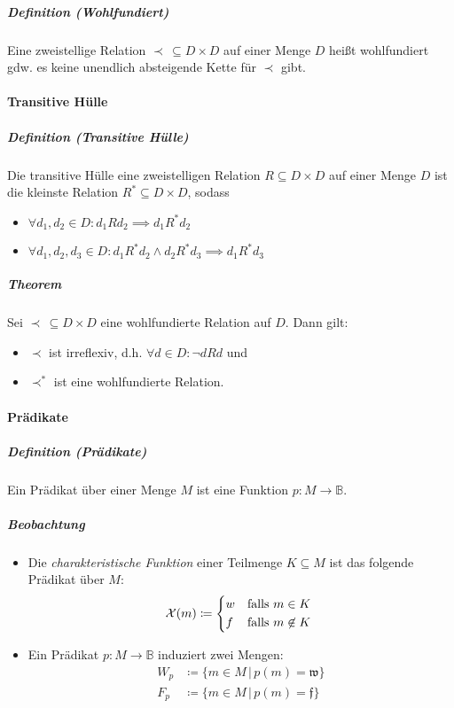 \documentclass[a4paper, 11pt, accentcolor = tud3b]{tudreport}
\newcommand{\forwhich}{\ensuremath{{\,\vert\,}}}
\newcommand{\definition}[2]{\subparagraph{Definition (#1)} #2}
\newcommand{\theorem}[1]{\subparagraph{Theorem} #1}
\begin{document}
			    \definition{Wohlfundiert}{Eine zweistellige Relation $ \prec \,\subseteq D \times D $ auf einer Menge $ D $ heißt wohlfundiert gdw. es keine unendlich absteigende Kette für $ \prec $ gibt.}
		    
		    \paragraph{Transitive Hülle}
			    \definition{Transitive Hülle}{
				    Die transitive Hülle eine zweistelligen Relation $ R \subseteq D \times D $ auf einer Menge $ D $ ist die kleinste Relation $ R ^ * \subseteq D \times D $, sodass
				    \begin{itemize}
				    	\item $ \forall d _ 1, d _ 2 \in D : d _ 1 R d _ 2 \implies d _ 1 R ^ * d _ 2 $
				    	\item $ \forall d _ 1, d _ 2, d _ 3 \in D : d _ 1 R ^ * d _ 2 \land d _ 2 R ^ * d _ 3 \implies d _ 1 R ^ * d _ 3 $
				    \end{itemize}
				}
			    
			    \theorem{
				    Sei $ \prec \,\subseteq D \times D $ eine wohlfundierte Relation auf $ D $. Dann gilt:
				    \begin{itemize}
				    	\item $ \prec $ ist irreflexiv, d.h. $ \forall d \in D : \lnot d R d $ und
				    	\item $ \prec ^ * $ ist eine wohlfundierte Relation.
				    \end{itemize}
				}
		    
		    \paragraph{Prädikate}
			    \definition{Prädikate}{Ein Prädikat über einer Menge $ M $ ist eine Funktion $ p : M \rightarrow \mathbb{B} $.}
			    
			    \subparagraph{Beobachtung}
			    \begin{itemize}
			    	\item Die \textit{charakteristische Funktion} einer Teilmenge $ K \subseteq M $ ist das folgende Prädikat über $ M $:
				    	\begin{equation*}
					    	\mathcal{X}(m) \coloneqq \begin{cases*}
						    	w & \text{falls $ m \in K $} \\
						    	f & \text{falls $ m \not\in K $} \\
					    	\end{cases*}
				    	\end{equation*}
				    \item Ein Prädikat $ p : M \rightarrow \mathbb{B} $ induziert zwei Mengen:
					    \begin{align*}
						    W _ p &\coloneqq \{ m \in M \forwhich p(m) = \mathfrak{w} \} \\
						    F _ p &\coloneqq \{ m \in M \forwhich p(m) = \mathfrak{f} \} \\
					    \end{align*}
			    \end{itemize}
\end{document}
